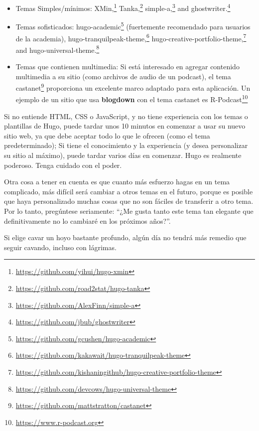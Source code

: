 \documentclass[12pt,]{krantz}
\renewenvironment{quote}{\begin{VF}}{\end{VF}}
\renewcommand{\href}[2]{#2\footnote{\url{#1}}}
\theoremstyle{definition}
\theoremstyle{definition}
\theoremstyle{definition}
\theoremstyle{remark}
\begin{document}
\begin{itemize}
\item
  Temas Simples/mínimos:
  \href{https://github.com/yihui/hugo-xmin}{XMin,}
  \href{https://github.com/road2stat/hugo-tanka}{Tanka,}
  \href{https://github.com/AlexFinn/simple-a}{simple-a,} and
  \href{https://github.com/jbub/ghostwriter}{ghostwriter.}
\item
  Temas sofisticados:
  \href{https://github.com/gcushen/hugo-academic}{hugo-academic}
  (fuertemente recomendado para usuarios de la academia),
  \href{https://github.com/kakawait/hugo-tranquilpeak-theme}{hugo-tranquilpeak-theme,}
  \href{https://github.com/kishaningithub/hugo-creative-portfolio-theme}{hugo-creative-portfolio-theme,}
  and
  \href{https://github.com/devcows/hugo-universal-theme}{hugo-universal-theme.}
\item
  Temas que contienen multimedia: Si está interesado en agregar
  contenido multimedia a su sitio (como archivos de audio de un
  podcast), el tema
  \href{https://github.com/mattstratton/castanet}{castanet} proporciona
  un excelente marco adaptado para esta aplicación. Un ejemplo de un
  sitio que usa \textbf{blogdown} con el tema castanet es
  \href{https://www.r-podcast.org}{R-Podcast}
\end{itemize}

Si no entiende HTML, CSS o JavaScript, y no tiene experiencia con los
temas o plantillas de Hugo, puede tardar unos 10 minutos en comenzar a
usar su nuevo sitio web, ya que debe aceptar todo lo que le ofrecen
(como el tema predeterminado); Si tiene el conocimiento y la experiencia
(y desea personalizar su sitio al máximo), puede tardar varios días en
comenzar. Hugo es realmente poderoso. Tenga cuidado con el poder.

Otra cosa a tener en cuenta es que cuanto más esfuerzo hagas en un tema
complicado, más difícil será cambiar a otros temas en el futuro, porque
es posible que haya personalizado muchas cosas que no son fáciles de
transferir a otro tema. Por lo tanto, pregúntese seriamente: ``¿Me gusta
tanto este tema tan elegante que definitivamente no lo cambiaré en los
próximos años?''.

\begin{quote}
Si elige cavar un hoyo bastante profundo, algún día no tendrá más
remedio que seguir cavando, incluso con lágrimas.

\end{quote}
\end{document}
